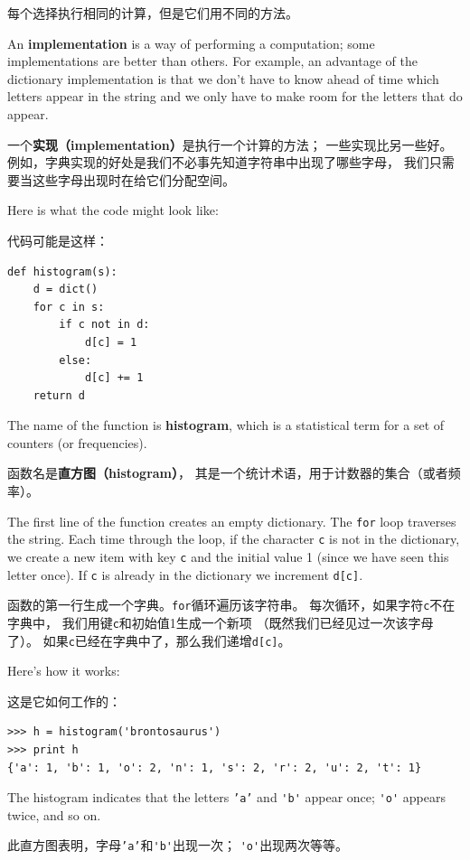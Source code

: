 \documentclass[10pt]{book}
\begin{document}
\begin{CJK}{UTF8}{gbsn}
每个选择执行相同的计算，但是它们用不同的方法。

An {\bf implementation} is a way of performing a computation;
some implementations are better than others.  For example,
an advantage of the dictionary implementation is that we don't
have to know ahead of time which letters appear in the string
and we only have to make room for the letters that do appear.

一个{\bf 实现（implementation）}是执行一个计算的方法；
一些实现比另一些好。
例如，字典实现的好处是我们不必事先知道字符串中出现了哪些字母，
我们只需要当这些字母出现时在给它们分配空间。

Here is what the code might look like:

代码可能是这样：

\begin{verbatim}
def histogram(s):
    d = dict()
    for c in s:
        if c not in d:
            d[c] = 1
        else:
            d[c] += 1
    return d
\end{verbatim}
%
The name of the function is {\bf histogram}, which is a statistical
term for a set of counters (or frequencies).

函数名是{\bf 直方图（histogram）}，
其是一个统计术语，用于计数器的集合（或者频率）。

The first line of the
function creates an empty dictionary.  The {\tt for} loop traverses
the string.  Each time through the loop, if the character {\tt c} is
not in the dictionary, we create a new item with key {\tt c} and the
initial value 1 (since we have seen this letter once).  If {\tt c} is
already in the dictionary we increment {\tt d[c]}.

函数的第一行生成一个字典。{\tt for}循环遍历该字符串。
每次循环，如果字符{\tt c}不在字典中，
我们用键{\tt c}和初始值1生成一个新项
（既然我们已经见过一次该字母了）。
如果{\tt c}已经在字典中了，那么我们递增{\tt d[c]}。

Here's how it works:

这是它如何工作的：

\begin{verbatim}
>>> h = histogram('brontosaurus')
>>> print h
{'a': 1, 'b': 1, 'o': 2, 'n': 1, 's': 2, 'r': 2, 'u': 2, 't': 1}
\end{verbatim}
%
The histogram indicates that the letters {\tt 'a'} and \verb"'b'"
appear once; \verb"'o'" appears twice, and so on.

此直方图表明，字母{\tt 'a'}和\verb"'b'"出现一次；
\verb"'o'"出现两次等等。


\end{CJK}
\end{document}
